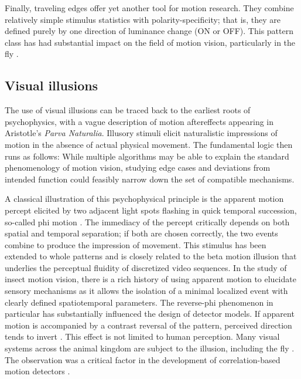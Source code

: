 Finally, traveling edges offer yet another tool for motion research. They combine relatively simple stimulus statistics with polarity-specificity; that is, they are defined purely by one direction of luminance change (ON or OFF). This pattern class has had substantial impact on the field of motion vision, particularly in the fly \citep{Joesch:2010fw,Clark:2011gw,Eichner:2011ic}.

\subsection{Visual illusions}
The use of visual illusions can be traced back to the earliest roots of psychophysics, with a vague description of motion aftereffects appearing in Aristotle's \textit{Parva Naturalia}. Illusory stimuli elicit naturalistic impressions of motion in the absence of actual physical movement. The fundamental logic then runs as follows: While multiple algorithms may be able to explain the standard phenomenology of motion vision, studying edge cases and deviations from intended function could feasibly narrow down the set of compatible mechanisms.

A classical illustration of this psychophysical principle is the apparent motion percept elicited by two adjacent light spots flashing in quick temporal succession, so-called phi motion \citep{Wertheimer:1912aa}. The immediacy of the percept critically depends on both spatial and temporal separation; if both are chosen correctly, the two events combine to produce the impression of movement. This stimulus has been extended to whole patterns \citep{Anstis:1970tv} and is closely related to the beta motion illusion that underlies the perceptual fluidity of discretized video sequences. In the study of insect motion vision, there is a rich history of using apparent motion to elucidate sensory mechanisms as it allows the isolation of a minimal localized event with clearly defined spatiotemporal parameters. The reverse-phi phenomenon in particular has substantially influenced the design of detector models. If apparent motion is accompanied by a contrast reversal of the pattern, perceived direction tends to invert \citep{Anstis:1975tu,Chubb:1989tw}. This effect is not limited to human perception. Many visual systems across the animal kingdom are subject to the illusion, including the fly \citep{Egelhaaf:1992wh,Krekelberg:2005cb,Orger:2000cy,Tuthill:2011ic,Eichner:2011ic,Clark:2011gw}. The observation was a critical factor in the development of correlation-based motion detectors \citep{Hassenstein:1956fa}.

